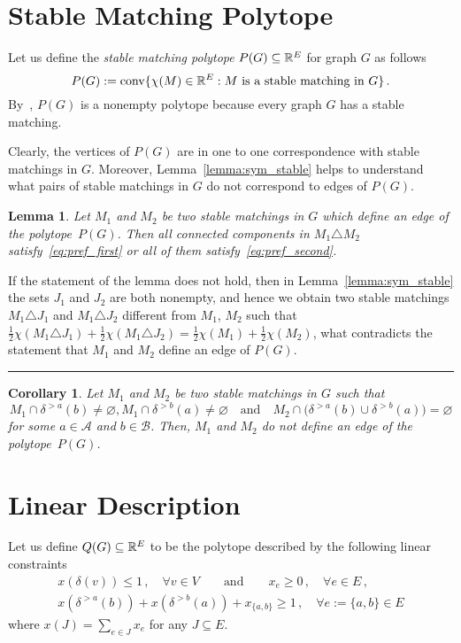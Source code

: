 \documentclass[preprint]{elsarticle}
\newtheorem{lemma}[fact]{Lemma}
\newtheorem{corollary}[fact]{Corollary}
\newenvironment{proof}{{\bf Proof:  }}{\hfill\rule{2mm}{2mm}}
\DeclareMathOperator{\convOp}{conv}
\newcommand{\conv}{\convOp}
\begin{document}
\section{Stable Matching Polytope}

Let us define the \emph{stable matching polytope} $P(G)\subseteq\mathbb{R}^E$ for graph $G$ as follows
$$
	P(G):=\conv\{\chi(M)\in\R^E: M \text{ is a stable matching in } G\}\,.
$$
By~\cite{}, $P(G)$ is a nonempty polytope because every graph $G$ has a stable matching.

Clearly, the vertices of $P(G)$ are in one to one correspondence with stable matchings in $G$. Moreover, Lemma~\ref{lemma:sym_stable} helps to understand what pairs of stable matchings in $G$ do not correspond to edges of $P(G)$.

\begin{lemma}\label{lemma:edge}
Let $M_1$ and $M_2$ be two stable matchings in $G$ which define an edge of the polytope~$P(G)$. Then all connected components in $M_1\triangle M_2$ satisfy~\eqref{eq:pref_first} or all of them satisfy~\eqref{eq:pref_second}.  
\end{lemma}
\begin{proof}
If the statement of the lemma does not hold, then in Lemma~\ref{lemma:sym_stable} the sets $J_1$ and $J_2$ are both nonempty, and hence we obtain two stable matchings $M_1\triangle J_1$ and $M_1\triangle J_2$ different from $M_1$, $M_2$ such that $\frac{1}{2}\chi(M_1\triangle J_1)+\frac{1}{2}\chi(M_1\triangle J_2)=\frac{1}{2}\chi(M_1)+\frac{1}{2}\chi(M_2)$, what contradicts the statement that $M_1$ and $M_2$ define an edge of $P(G)$.
\end{proof}


\begin{corollary}\label{cor:edge}
Let $M_1$ and $M_2$ be two stable matchings in $G$ such that
$$
	M_1\cap\delta^{>a}(b)\neq\varnothing, M_1\cap\delta^{>b}(a)\neq\varnothing\quad\text{and}\quad M_2\cap\big(\delta^{>a}(b)\cup \delta^{>b}(a)\big)=\varnothing 
$$
 for some $a\in\mathcal{A}$ and $b\in\mathcal{B}$. Then, $M_1$ and $M_2$ do not define an edge of the polytope~$P(G)$.
\end{corollary}


\section{Linear Description}
Let us define $Q(G)\subseteq\mathbb{R}^E$ to be the polytope described  by the following linear constraints
\begin{align}
x(\delta(v)) \leq 1\,,\quad \forall v \in V\qquad \text{and} \qquad x_e \geq 0\,,\quad \forall e \in E\,,\label{eq:lin_descr_match}\\
x(\delta^{>a}(b))+ x(\delta^{>b}(a)) + x_{\{a,b\}} \geq 1\,, \quad \forall e:=\{a,b\} \in E \label{eq:lin_descr_stab}
\end{align}
where $x(J) = \sum_{e \in J} x_e$ for any $J \subseteq E$.
\end{document}

